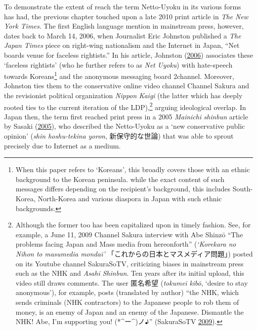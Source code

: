 \documentclass[10pt,british,A4paper,twoside]{memoir}
\begin{document}
To demonstrate the extent of reach the term Netto-Uyoku in its various
forms has had, the previous chapter touched upon a late 2010 print
article in \emph{The New York Times}. The first English language mention
in mainstream press, however, dates back to March 14, 2006, when
Journalist Eric Johnston published a \emph{The Japan Times} piece on
right-wing nationalism and the Internet in Japan, ``Net boards venue for
faceless rightists.'' In his article, Johnston
(\protect\hyperlink{ref-johnston_net_2006}{2006}) associates these
`faceless rightists' (who he further refers to as \emph{Net Uyoku}) with
hate-speech towards Koreans\footnote{When this paper refers to
  `Koreans', this broadly covers those with an ethnic background to the
  Korean peninsula. while the exact content of such messages differs
  depending on the recipient's background, this includes South-Korea,
  North-Korea and various diaspora in Japan with such ethnic backgrounds.} and
the anonymous messaging board 2channel. Moreover, Johnston ties them to
the conservative online video channel Channel Sakura and the revisionist
political organization \emph{Nippon Kaigi} (the latter which has deeply
rooted ties to the current iteration of the LDP),\footnote{Although the
  former too has been capitalized upon in timely fashion. See, for
  example, a June 11, 2009 Channel Sakura interview with Abe Shinzō
  ``The problems facing Japan and Mass media from hereonforth''
  (\emph{`Korekara no Nihon to masumedia mondai'}
  「これからの日本とマスメディア問題」) posted on its Youtube channel
  SakuraSoTV, criticizing biases in mainstream press such as the NHK and
  \emph{Asahi Shinbun}. Ten years after its initial upload, this video
  still draws comments. The user 匿名希望 (\emph{tokumei kibō}, `desire
  to stay anonymous'), for example, posts (translated by author) ``the
  NHK, which sends criminals (NHK contractors) to the Japanese people to
  rob them of money, is an enemy of Japan and an enemy of the Japanese.
  Dismantle the NHK! Abe, I'm supporting you! (*\^{}ー\^{})ノ♪''
  (SakuraSoTV \protect\hyperlink{ref-sakurasotv_eng._2009}{2009}).}
arguing ideological overlap. In Japan then, the term first reached print
press in a 2005 \emph{Mainichi shinbun} article by Sasaki
(\protect\hyperlink{ref-sasaki_netto-uyoku_2005}{2005}), who described
the Netto-Uyoku as a `new conservative public opinion' (\emph{shin
hoshu-tekina yoron}, 新保守的な世論) that was able to sprout precisely
due to Internet as a medium.
\end{document}
